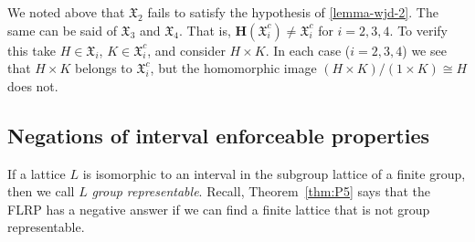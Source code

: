 \documentclass{gen-j-l}
\newcommand{\<}{\ensuremath{\langle}}
\renewcommand{\>}{\ensuremath{\rangle}}
\theoremstyle{plain}
\theoremstyle{definition}
\theoremstyle{remark}
\numberwithin{theorem}{section}
\numberwithin{claim}{section}
\numberwithin{equation}{section}
\numberwithin{conjecture}{section}
\newcommand{\defn}[1]{\emph{#1}}
\newcommand{\2}{\ensuremath{\mathbf{2}}}
\newcommand{\3}{\ensuremath{\mathbf{3}}}
\newcommand{\sG}{\ensuremath{\mathfrak{X}}}
\newcommand{\bH}{\ensuremath{\mathbf{H}}}
\begin{document}
We noted above that $\sG_2$ fails to satisfy the hypothesis of
\ref{lemma-wjd-2}. The same can be said of $\sG_3$ and $\sG_4$. That is, 
$\bH(\sG_i^c) \neq \sG_i^c$ for $i= 2, 3, 4$.  To verify this take $H\in
\sG_i$, $K\in \sG_i^c$, and consider $H\times K$.  In each case ($i=2, 3, 4$) we
see that $H\times K$ belongs to $\sG_i^c$, but the homomorphic image
$(H\times K)/(1\times K) \cong H$ does not. 

\subsection{Negations of interval enforceable properties}
\label{sec:negat-interv-enforc}
If a lattice $L$
is isomorphic to an interval in the subgroup lattice of a finite group, then we call
$L$ \defn{group representable}.  Recall, Theorem~\ref{thm:P5} says that the
\acs{FLRP} has a negative answer if we can find a finite lattice that is not group
representable. 
\end{document}
